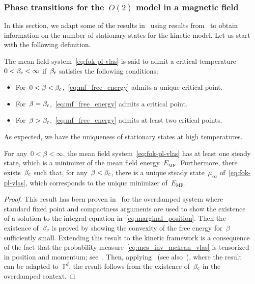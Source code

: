 \documentclass[onefignum,onetabnum]{siamart251216} %
\newcommand{\torus}{\mathbb T}
\newcommand{\mescin}{\mu}
\newcommand{\emf}{E_{\mathrm{MF}}}
\theoremstyle{plain}
\numberwithin{equation}{section}
\numberwithin{theorem}{section}
\newcounter{ucounter}
\newcommand{\uv}[1]{
  \stepcounter{ucounter}
  \textcolor{orange}{
      \\[.2cm]
    U, comment \arabic{ucounter}. #1
    \\[.2cm]
  }
}
\renewcommand{\uv}[1]{\textcolor{orange}{#1}}
\begin{document}
\subsubsection{Phase transitions for the~\texorpdfstring{$O(2)$}{O(2)} model in a magnetic field}
\label{sec:phase_transition}
In this section, we adapt some of the results in~\cite{carrillo2020long}
using results from~\cite{duong2016stationary} to obtain information on the number of stationary states for the kinetic model. Let us start with the following definition.
\begin{definition}
    \label{def:phase_transition}
    The mean field system~\eqref{eq:fok-pl-vlas} is said to admit a critical temperature~$0<\beta_{\rm c} < \infty$
    if~$\beta_{\rm c}$ satisfies the following conditions:
    \begin{itemize}
        \item For~$0<\beta <\beta_{\rm c}$,~\eqref{eq:mf_free_energy} admits a unique critical point.
        \item For~$\beta =\beta_{\rm c}$,~\eqref{eq:mf_free_energy} admits a critical point. %
        \item For~$\beta > \beta_{\rm c}$,~\eqref{eq:mf_free_energy} admits at least two critical points.
    \end{itemize}
\end{definition}
As expected, we have the uniqueness of stationary states at high temperatures.
\begin{proposition}
    \label{prop:uniq_stationary}
    For any~$0<\beta < \infty$,
    the mean field system~\eqref{eq:fok-pl-vlas} has at least one steady state, which is a minimizer of the mean field energy~$\emf$.
    Furthermore,
    there exists~$\beta_{\rm{c}}$ such that, for any~$\beta <\beta_{\rm{c}}$,
    there is a unique steady state~$\mescin_\infty$ of~\eqref{eq:fok-pl-vlas},
    which corresponds to the unique minimizer of~$\emf$.
\end{proposition}
\begin{proof}
    This result has been proven in~\cite[Theorem 2.3 and Proposition 2.8]{carrillo2020long} for the overdamped system where standard fixed point and compactness arguments are used to show the existence of a solution to the integral equation in~\eqref{eq:marginal_position}.
    Then the existence of~$\beta_{\rm c}$ is proved by showing the convexity of the free energy for~$\beta$ sufficiently small.
    Extending this result to the kinetic framework is a consequence of the fact that the probability measure~\eqref{eq:mes_inv_mckean_vlas} is tensorized in position and momentum; see~\cite{duong2016stationary}.
    Then, applying~\cite[Theorem 1]{duong2016stationary} (see also~\cite{dressler1987stationary,dressler1990steady}),
    where the result can be adapted to~$\torus^d$,
    the result follows from the existence of~$\beta_{\rm c}$ in the overdamped context.
\end{proof}
\end{document}
